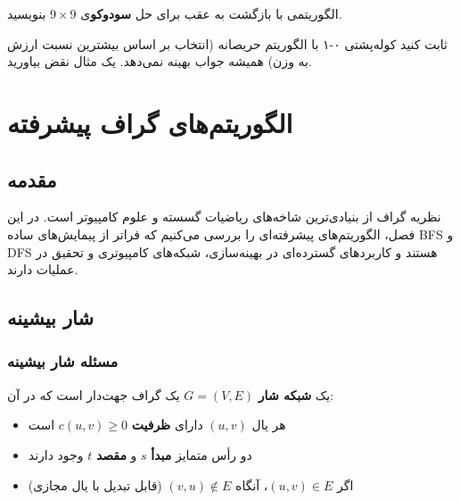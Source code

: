 \documentclass{matinbook}
\begin{document}
    \begin{exercise}
        الگوریتمی با بازگشت به عقب
        برای حل \textbf{سودوکو}ی $9 \times 9$ بنویسید.
        \label{exc:sudoku}
    \end{exercise}
    
    \begin{exercise}
        ثابت کنید کوله‌پشتی ۰-۱ با الگوریتم حریصانه
        (انتخاب بر اساس بیشترین نسبت ارزش به وزن)
        همیشه جواب بهینه نمی‌دهد.
        یک مثال نقض بیاورید.
        \label{exc:knapsack-counter}
    \end{exercise}
    
    
    
    
    \chapter{الگوریتم‌های گراف پیشرفته}
    \label{chap:advanced-graphs}
    
    \section{مقدمه}
    
    نظریه گراف از بنیادی‌ترین
    شاخه‌های ریاضیات گسسته و علوم کامپیوتر است.
    در این فصل، الگوریتم‌های پیشرفته‌ای را بررسی می‌کنیم
    که فراتر از پیمایش‌های ساده BFS و DFS هستند
    و کاربردهای گسترده‌ای در بهینه‌سازی، شبکه‌های
    کامپیوتری و تحقیق در عملیات دارند.
    
    \section{شار بیشینه}
    
    \subsection{مسئله شار بیشینه}
    
    \begin{definition}
        یک \textbf{شبکه شار}
        $G = (V, E)$ یک گراف جهت‌دار است که در آن:
        \begin{itemize}
            \item هر یال $(u, v)$ دارای \textbf{ظرفیت}
            $c(u, v) \geq 0$ است
            \item دو رأس متمایز \textbf{مبدأ} $s$ و
            \textbf{مقصد} $t$ وجود دارند
            \item اگر $(u, v) \in E$، آنگاه
            $(v, u) \notin E$ (قابل تبدیل با یال مجازی)
        \end{itemize}
        \label{def:flow-network}
    \end{definition}
    
\end{document}
